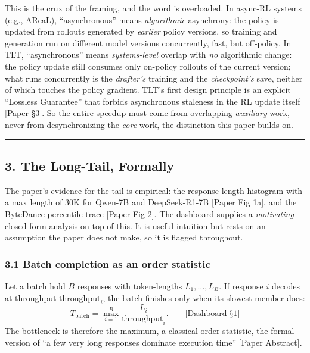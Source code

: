 \documentclass[
  11pt,
  letterpaper,
]{article}
\begin{document}
This is the crux of the framing, and the word is overloaded. In async-RL
systems (e.g., AReaL), ``asynchronous'' means \emph{algorithmic}
asynchrony: the policy is updated from rollouts generated by
\emph{earlier} policy versions, so training and generation run on
different model versions concurrently, fast, but off-policy. In TLT,
``asynchronous'' means \emph{systems-level} overlap with \emph{no}
algorithmic change: the policy update still consumes only on-policy
rollouts of the current version; what runs concurrently is the
\emph{drafter's} training and the \emph{checkpoint's} save, neither of
which touches the policy gradient. TLT's first design principle is an
explicit ``Lossless Guarantee'' that forbids asynchronous staleness in
the RL update itself {[}Paper §3{]}. So the entire speedup must come
from overlapping \emph{auxiliary} work, never from desynchronizing the
\emph{core} work, the distinction this paper builds on.

\begin{center}\rule{0.5\linewidth}{0.5pt}\end{center}

\subsection{3. The Long-Tail, Formally}\label{the-long-tail-formally}

The paper's evidence for the tail is empirical: the response-length
histogram with a max length of 30K for Qwen-7B and DeepSeek-R1-7B
{[}Paper Fig 1a{]}, and the ByteDance percentile trace {[}Paper Fig
2{]}. The dashboard supplies a \emph{motivating} closed-form analysis on
top of this. It is useful intuition but rests on an assumption the paper
does not make, so it is flagged throughout.

\subsubsection{3.1 Batch completion as an order
statistic}\label{batch-completion-as-an-order-statistic}

Let a batch hold \(B\) responses with token-lengths \(L_1,\dots,L_B\).
If response \(i\) decodes at throughput \(\text{throughput}_i\), the
batch finishes only when its slowest member does:
\[T_{\text{batch}} = \max_{i=1}^{B}\frac{L_i}{\text{throughput}_i}.\qquad\text{[Dashboard §1]}\]
The bottleneck is therefore the maximum, a classical order statistic,
the formal version of ``a few very long responses dominate execution
time'' {[}Paper Abstract{]}.
\end{document}
